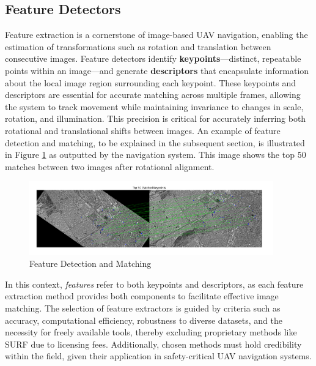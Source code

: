 


\subsection{Feature Detectors}

Feature extraction is a cornerstone of image-based UAV navigation, enabling the estimation of transformations such as rotation and translation between consecutive images. Feature detectors identify \textbf{keypoints}—distinct, repeatable points within an image—and generate \textbf{descriptors} that encapsulate information about the local image region surrounding each keypoint. These keypoints and descriptors are essential for accurate matching across multiple frames, allowing the system to track movement while maintaining invariance to changes in scale, rotation, and illumination. This precision is critical for accurately inferring both rotational and translational shifts between images. An example of feature detection and matching, to be explained in the subsequent section, is illustrated in Figure \ref{fig:feature_detection} as outputted by the navigation system. This image shows the top 50 matches between two images after rotational alignment. 

\begin{figure}[H]
    \centering
    \includegraphics[width=0.94\textwidth]{./Chapter 2/litfigs/matche.png}
    \caption{Feature Detection and Matching}
    \label{fig:feature_detection}
\end{figure}





In this context, \textit{features} refer to both keypoints and descriptors, as each feature extraction method provides both components to facilitate effective image matching. The selection of feature extractors is guided by criteria such as accuracy, computational efficiency, robustness to diverse datasets, and the necessity for freely available tools, thereby excluding proprietary methods like SURF due to licensing fees. Additionally, chosen methods must hold credibility within the field, given their application in safety-critical UAV navigation systems.

